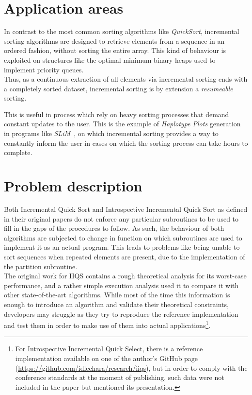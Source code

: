 \section{Application areas}

In contrast to the most common sorting algorithms like \emph{QuickSort}, incremental sorting algorithms are designed to retrieve elements from a sequence in an ordered fashion, without sorting the entire array. This kind of behaviour is exploited on structures like the optimal minimum binary heaps used to implement priority queues. \\

Thus, as a continuous extraction of all elements via incremental sorting ends with a completely sorted dataset, incremental sorting is by extension a \emph{resumeable} sorting.

This is useful in process which rely on heavy sorting processes that demand constant updates to the user. This is the example of \emph{Haplotype Plots} generation in programs like \emph{SLiM}~\cite{10.1093/molbev/msw211}, on which incremental sorting provides a way to constantly inform the user in cases on which the sorting process can take hours to complete.\\

\section{Problem description}
Both Incremental Quick Sort and Introspective Incremental Quick Sort as defined in their original papers \cite{7416566} do not enforce any particular subroutines to be used to fill in the gaps of the procedures to follow. As such, the behaviour of both algorithms are subjected to change in function on which subroutines are used to implement it as an actual program. This leads to problems like being unable to sort sequences when repeated elements are present, due to the implementation of the partition subroutine.\\

The original work for IIQS contains a rough theoretical analysis for its worst-case performance, and a rather simple execution analysis used it to compare it with other state-of-the-art algorithms. While most of the time this information is enough to introduce an algorithm and validate their theoretical constraints, developers may struggle as they try to reproduce the reference implementation and test them in order to make use of them into actual applications\footnote{For Introspective Incremental Quick Select, there is a reference implementation available on one of the author's GitHub page (\url{https://github.com/idlechara/research/iiqs}), but in order to comply with the conference standards at the moment of publishing, such data were not included in the paper but mentioned its presentation.}.\\ 

